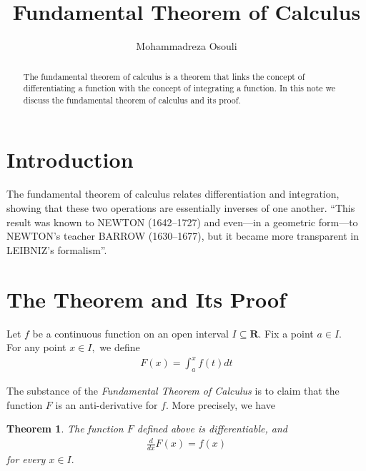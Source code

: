 \documentclass{article}
\title{Fundamental Theorem of Calculus}
\author{Mohammadreza Osouli}
\date{}
\newtheorem{theorem}{Theorem}
\begin{document}
\maketitle

\begin{abstract}
    The fundamental theorem of calculus is a theorem that links the concept of differentiating a function with the concept of integrating a function. In this note we discuss the fundamental theorem of calculus and its proof.
\end{abstract}

\section*{Introduction}
The fundamental theorem of calculus relates differentiation and integration, showing that these two operations are essentially inverses of one another. “This result was known to NEWTON (1642–1727) and even—in a geometric form—to NEWTON’s teacher BARROW (1630–1677), but it became more transparent in LEIBNIZ’s formalism”. \cite{Stillwell}

\section{The Theorem and Its Proof}
Let $f$ be a continuous function on an open interval 
$ I \subseteq \mathbf{R}.$
Fix a point 
$ a \in I. $ \\
For any point 
$ x \in I, $
we define
\begin{align}\tag{$\dagger$}
   F(x) = \int^x_a f(t)dt 
\end{align}

The substance of the \textit{Fundamental Theorem of Calculus} is to claim  that the function $F$ is an anti-derivative for $f$.
More precisely, we have

\begin{theorem}
The function $F$ defined above is differentiable, and
\begin{align*}
    \frac{d}{dx}F(x) = f(x)
\end{align*}
for every $x \in I. $
\end{theorem}
\end{document}
